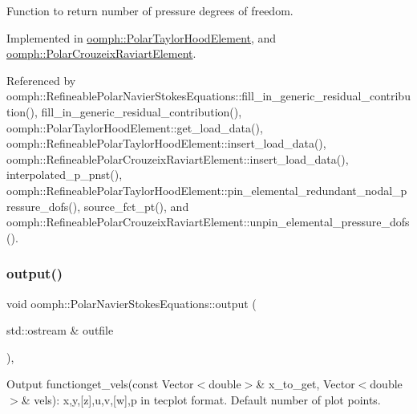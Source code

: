 Function to return number of pressure degrees of freedom. 



Implemented in \hyperlink{classoomph_1_1PolarTaylorHoodElement_a4ffb1ba7522ccb0d2fb181faa5bdf79b}{oomph\+::\+Polar\+Taylor\+Hood\+Element}, and \hyperlink{classoomph_1_1PolarCrouzeixRaviartElement_a22bc07f82b9e2c5b373db917ca071085}{oomph\+::\+Polar\+Crouzeix\+Raviart\+Element}.



Referenced by oomph\+::\+Refineable\+Polar\+Navier\+Stokes\+Equations\+::fill\+\_\+in\+\_\+generic\+\_\+residual\+\_\+contribution(), fill\+\_\+in\+\_\+generic\+\_\+residual\+\_\+contribution(), oomph\+::\+Polar\+Taylor\+Hood\+Element\+::get\+\_\+load\+\_\+data(), oomph\+::\+Refineable\+Polar\+Taylor\+Hood\+Element\+::insert\+\_\+load\+\_\+data(), oomph\+::\+Refineable\+Polar\+Crouzeix\+Raviart\+Element\+::insert\+\_\+load\+\_\+data(), interpolated\+\_\+p\+\_\+pnst(), oomph\+::\+Refineable\+Polar\+Taylor\+Hood\+Element\+::pin\+\_\+elemental\+\_\+redundant\+\_\+nodal\+\_\+pressure\+\_\+dofs(), source\+\_\+fct\+\_\+pt(), and oomph\+::\+Refineable\+Polar\+Crouzeix\+Raviart\+Element\+::unpin\+\_\+elemental\+\_\+pressure\+\_\+dofs().

\mbox{\label{classoomph_1_1PolarNavierStokesEquations_a720f9b13abd3bf876793f1f9e8538f61}} 
\subsubsection{\texorpdfstring{output()}{output()}\hspace{0.1cm}{\footnotesize\ttfamily [1/4]}}
{\footnotesize\ttfamily void oomph\+::\+Polar\+Navier\+Stokes\+Equations\+::output (\begin{DoxyParamCaption}\item[{std\+::ostream \&}]{outfile }\end{DoxyParamCaption})\hspace{0.3cm}{\ttfamily [inline]}, {\ttfamily [virtual]}}



Output functionget\+\_\+vels(const Vector$<$double$>$\& x\+\_\+to\+\_\+get, Vector$<$double$>$\& vels)\+: x,y,\mbox{[}z\mbox{]},u,v,\mbox{[}w\mbox{]},p in tecplot format. Default number of plot points. 



